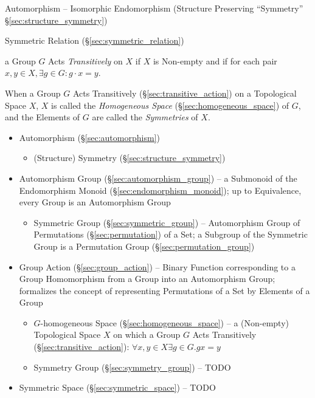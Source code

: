 Automorphism -- Isomorphic Endomorphism
(Structure Preserving ``Symmetry'' \S\ref{sec:structure_symmetry})

Symmetric Relation (\S\ref{sec:symmetric_relation})

a Group $G$ Acts \emph{Transitively} on $X$ if $X$ is Non-empty and if for each
pair $x,y \in X, \exists g \in G : g \cdot x = y$.

When a Group $G$ Acts Transitively (\S\ref{sec:transitive_action}) on a
Topological Space $X$, $X$ is called the \emph{Homogeneous Space}
(\S\ref{sec:homogeneous_space}) of $G$, and the Elements of $G$ are called the
\emph{Symmetries} of $X$.

\begin{itemize}
  \item Automorphism (\S\ref{sec:automorphism})
    \begin{itemize}
      \item (Structure) Symmetry (\S\ref{sec:structure_symmetry})
    \end{itemize}
  \item Automorphism Group (\S\ref{sec:automorphism_group}) -- a Submonoid of
    the Endomorphism Monoid (\S\ref{sec:endomorphism_monoid}); up to
    Equivalence, every Group is an Automorphism Group
    \begin{itemize}
      \item Symmetric Group (\S\ref{sec:symmetric_group}) -- Automorphism Group
        of Permutations (\S\ref{sec:permutation}) of a Set; a Subgroup of the
        Symmetric Group is a Permutation Group (\S\ref{sec:permutation_group})
    \end{itemize}
  \item Group Action (\S\ref{sec:group_action}) -- Binary Function corresponding
    to a Group Homomorphism from a Group into an Automorphism Group; formalizes
    the concept of representing Permutations of a Set by Elements of a Group
    \begin{itemize}
      \item $G$-homogeneous Space (\S\ref{sec:homogeneous_space}) -- a
        (Non-empty) Topological Space $X$ on which a Group $G$ Acts
        Transitively (\S\ref{sec:transitive_action}):
        $\forall x,y \in X \exists g \in G . g x = y$
      \item Symmetry Group (\S\ref{sec:symmetry_group}) -- TODO
    \end{itemize}
  \item Symmetric Space (\S\ref{sec:symmetric_space}) -- TODO
\end{itemize}



